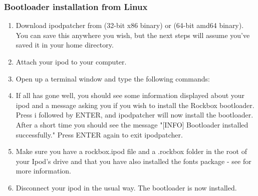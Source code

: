 \subsubsection{Bootloader installation from Linux}

\begin{enumerate} 

\item Download ipodpatcher from 
 (32-bit x86 
binary) or  
(64-bit amd64 binary). You can save this anywhere you wish, but the next 
steps will assume you've saved it in your home directory.

\item Attach your ipod to your computer.

\item Open up a terminal window and type the following commands:



\item If all has gone well, you should see some information displayed about
your ipod and a message asking you if you wish to install the Rockbox 
bootloader. Press i followed by ENTER, and ipodpatcher will now install the 
bootloader. After a short time you should see the message "[INFO] Bootloader 
installed successfully." Press ENTER again to exit ipodpatcher.

\item Make sure you have a rockbox.ipod file and a .rockbox folder in the 
root of your Ipod's drive and that you have also installed the fonts
package - see  for more information.

\item Disconnect your ipod in the usual way. The bootloader is now installed. 

\end{enumerate} 
